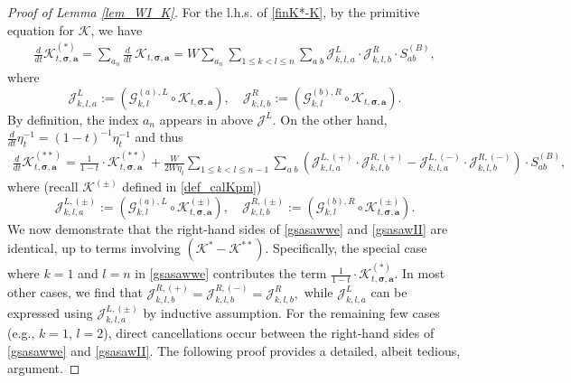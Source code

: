 \documentclass[10pt,a4paper]{amsart}
\newcommand{\cal}{\mathcal}
\begin{document}
\begin{proof}[Proof of Lemma \ref{lem_WI_K}]
 For the l.h.s. of \eqref{finK*-K}, by the primitive equation for  $\cal K$, we have 
  \begin{align} \label{gsasawwe}
     \frac{d}{dt} {\cal K}^{(*)}_{t, \boldsymbol{\sigma}, \textbf{a}}=\sum_{a_n} \frac{d}{dt}\,{\cal K}_{t, \boldsymbol{\sigma}, \textbf{a}} 
       =  
       {W}\sum_{a_n}  \sum_{1 \le k < l \le n}  
       \sum_{a\;b} 
        {\cal J}^{L}_{k,l,a}\cdot{\cal J}^{R}_{k,l,b}\cdot S^{(B)}_{ab},  
    \end{align}
    where %
    $$
    {\cal J}^L_{k,l,a}:= \left( {\cal G}^{(a), L}_{k, l} \circ {\cal K}_{t, \boldsymbol{\sigma}, \textbf{a}} \right), \quad
    {\cal J}^R_{k,l,b}:=\left( {\cal G}^{(b), R}_{k, l} \circ {\cal K}_{t, \boldsymbol{\sigma}, \textbf{a}} \right).
    $$
By definition, the index $a_n$ appears  in above $  {\cal J}^{L} $.    On the other hand,  $\frac{d}{dt} \eta_t^{-1}=(1-t)^{-1}\eta_t^{-1}$ and thus 
  \begin{align} \label{gsasawII}
     \frac{d}{dt} {\cal K}^{(**)}_{t, \boldsymbol{\sigma}, \textbf{a}}=\frac1{1-t}\cdot {\cal K}^{(**)}_{t, \boldsymbol{\sigma}, \textbf{a}}+ 
       \frac{W}{2W\eta_t}  \sum_{1\le k<l\le n-1} 
       \sum_{a\;b} 
       \left(
       {\cal J}^{L,(+)}_{k,l,a}\cdot{\cal J}^{R,(+)}_{k,l,b}
       -
      {\cal J}^{L,(-)}_{k,l,a}\cdot{\cal J}^{R,(-)}_{k,l,b}
       \right)\cdot S^{(B)}_{ab},
       \quad   
    \end{align}
 where (recall $\cal K^{(\pm)}$ defined in \eqref{def_calKpm})
 $$
    {\cal J}^{L,(\pm)}_{k,l,a}:= 
    \left( {\cal G}^{(a), L}_{k, l} \circ {\cal K}^{(\pm)}_{t, \boldsymbol{\sigma}, \textbf{a}} \right), \quad
    {\cal J}^{R,(\pm)}_{k,l,b}:=\left( {\cal G}^{(b), R}_{k, l} \circ  {\cal K}^{(\pm)}_{t, \boldsymbol{\sigma}, \textbf{a}} \right).
$$
We now demonstrate that the right-hand sides of \eqref{gsasawwe} and \eqref{gsasawII} are identical, up to terms involving \(({\cal K}^* - {\cal K}^{**})\). Specifically, the special case where \(k = 1\) and \(l = n\) in \eqref{gsasawwe} contributes the term \(\frac{1}{1-t} \cdot {\cal K}^{(*)}_{t, \boldsymbol{\sigma}, \textbf{a}}\). In most other cases, we find that 
$
{\cal J}^{R,(+)}_{k,l,b} = {\cal J}^{R,(-)}_{k,l,b} = {\cal J}^{R}_{k,l,b},
$
while 
$
{\cal J}^{L}_{k,l,a}
$  
can be expressed using 
$
{\cal J}^{L,(\pm)}_{k,l,a}
$
by inductive assumption. For the remaining few cases (e.g., \(k = 1\), \(l = 2\)), direct cancellations occur between the right-hand sides of \eqref{gsasawwe} and \eqref{gsasawII}. The following proof provides a detailed, albeit tedious,  argument. 
 




\end{proof}
\end{document}
